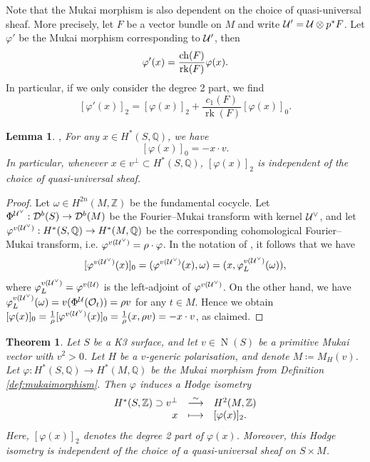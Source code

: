 \documentclass[11pt,twoside]{amsart}
\numberwithin{equation}{section}
\newtheorem{theorem}[dummy]{Theorem}
\newtheorem{lemma}[dummy]{Lemma}
\theoremstyle{definition}
\theoremstyle{plain}
\newcommand{\Z}{\ensuremath{\mathbb{Z}}}
\newcommand{\Q}{\ensuremath{\mathbb{Q}}}
\def\Db{\calD^{b}}
\def\rk{\operatorname{rk}}
\def\N{\operatorname{N}}
\begin{document}
Note that the Mukai morphism is also dependent on the choice of quasi-universal sheaf. More precisely, let $F$ be a vector bundle on $M$ and write $\mathcal{U}' = \mathcal{U}\otimes p^*F$. Let $\varphi'$ be the Mukai morphism corresponding to $\mathcal{U}'$, then $$\varphi'(x) = \frac{\ch(F)}{\rk(F)}\varphi(x).$$ In particular, if we only consider the degree 2 part, we find $$[\varphi'(x)]_2 = [\varphi(x)]_2+\frac{c_1(F)}{\rk(F)}[\varphi(x)]_0.$$ 

\begin{lemma} \cite[Proof of Theorem 1.5]{Muk87}, \cite{OGr97} \label{lem:mukaipairingmoduli}
    For any $x\in H^*(S,\Q)$, we have $$[\varphi(x)]_0 = -x\cdot v.$$ In particular, whenever $x\in v^\perp\subset H^*(S,\Q)$, $[\varphi(x)]_2$ is independent of the choice of quasi-universal sheaf.
\end{lemma}
\begin{proof}
    Let $\omega\in H^{2n}(M,\Z)$ be the fundamental cocycle. Let $\Phi^{\calU^\vee}:\Db(S)\to \Db(M)$ be the Fourier--Mukai transform with kernel $\mathcal{U}^\vee$, and let $\varphi^{v(\calU^\vee)}: H^*(S,\Q)\to H^*(M,\Q)$ be the corresponding cohomological Fourier--Mukai transform, i.e. $\varphi^{v(\mathcal{U}^\vee)} = \rho\cdot\varphi$.
    In the notation of \cite{Cal03},
    it follows that we have $$[\varphi^{v(\mathcal{U}^\vee)}(x)]_0= (\varphi^{v(\mathcal{U}^\vee)}(x),\omega) = (x,\varphi^{v(\mathcal{U}^\vee)}_L(\omega)),$$
    where $\varphi^{v(\mathcal{U}^\vee)}_L=\varphi^{v(\mathcal{U})}$ is the left-adjoint of $\varphi^{v(\mathcal{U}^\vee)}$. On the other hand, we have $\varphi^{v(\mathcal{U}^\vee)}_L(\omega) = v(\Phi^{\mathcal{U}}(\mathcal{O}_t))= \rho v$ for any $t\in M$. Hence we obtain $[\varphi(x)]_0 = \frac{1}{\rho}[\varphi^{v(\mathcal{U}^\vee)}(x)]_0 = \frac{1}{\rho}(x,\rho v) = -x\cdot v$, as claimed.
\end{proof}

\begin{theorem}\cite{OGr97,Yos01}\label{thm:mukaimorphism}
    Let $S$ be a K3 surface, and let $v\in \N(S)$ be a primitive Mukai vector with $v^2>0$. Let $H$ be a $v$-generic polarisation, and denote $M\coloneqq M_H(v)$. Let $\varphi: H^*(S,\Q)\to H^*(M,\Q)$ be the Mukai morphism from Definition \ref{def:mukaimorphism}. 
    Then $\varphi$ induces a Hodge isometry
    \begin{equation*}
           \isomorphismstar{H^*(S,\Z)\supset v^\perp}{H^2(M,\Z)}{x}{[\varphi(x)]_2.} 
    \end{equation*}
    Here, $[\varphi(x)]_2$ denotes the degree 2 part of $\varphi(x)$. Moreover, this Hodge isometry is independent of the choice of a quasi-universal sheaf on $S\times M$.
\end{theorem}
\end{document}
